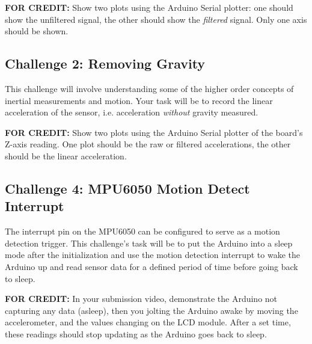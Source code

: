     \textbf{FOR CREDIT:} Show two plots using the Arduino Serial plotter: one should show the unfiltered signal, the other should show the \textit{filtered} signal. 
    Only one axis should be shown.

    \subsection*{Challenge 2: Removing Gravity}
    This challenge will involve understanding some of the higher order concepts of inertial measurements and motion.
    Your task will be to record the linear acceleration of the sensor, i.e. acceleration \textit{without} gravity measured.
    

    \textbf{FOR CREDIT:} Show two plots using the Arduino Serial plotter of the board's Z-axis reading. 
    One plot should be the raw or filtered accelerations, the other should be the linear acceleration. 
    
    \subsection*{Challenge 4: MPU6050 Motion Detect Interrupt}
    The interrupt pin on the MPU6050 can be configured to serve as a motion detection trigger.
    This challenge's task will be to put the Arduino into a sleep mode after the initialization and use the motion detection interrupt to wake the Arduino up and read sensor data for a defined period of time before going back to sleep.

    \textbf{FOR CREDIT:} In your submission video, demonstrate the Arduino not capturing any data (asleep), then you jolting the Arduino awake by moving the accelerometer, and the values changing on the LCD module.
    After a set time, these readings should stop updating as the Arduino goes back to sleep.
